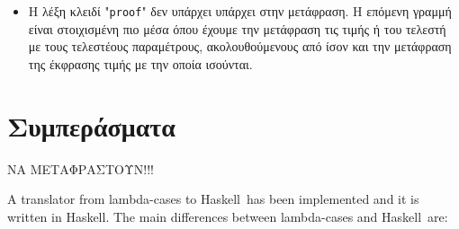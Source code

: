 \documentclass[diploma]{softlab-thesis}
\def\H{Haskell}
\begin{document}
\begin{itemize}
\begin{itemize}
\item
Η λέξη κλειδί "\texttt{proof}" δεν υπάρχει υπάρχει στην μετάφραση. Η
επόμενη γραμμή είναι στοιχισμένη πιο μέσα όπου έχουμε την μετάφραση τις τιμής
ή του τελεστή με τους τελεστέους παραμέτρους, ακολουθούμενους από ίσον και
την μετάφραση της έκφρασης τιμής με την οποία ισούνται.

\end{itemize}

\end{itemize}

\chapter{Συμπεράσματα}

ΝΑ ΜΕΤΑΦΡΑΣΤΟΥΝ!!!

A translator from lambda-cases to \H\ has been implemented and it is written in
\H. The main differences between lambda-cases and \H\ are:
\end{document}

